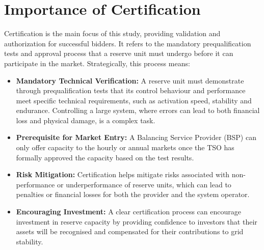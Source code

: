 \section{Importance of Certification}
Certification is the main focus of this study, providing validation and authorization for successful bidders. It refers to the mandatory prequalification tests and approval process that a reserve unit must undergo before it can participate in the market. Strategically, this process means:
\begin{itemize}
    \item \textbf{Mandatory Technical Verification:} A reserve unit must demonstrate through prequalification tests that its control behaviour and performance meet specific technical requirements, such as activation speed, stability and endurance. Controlling a large system, where errors can lead to both financial loss and physical damage, is a complex task.
    \item \textbf{Prerequisite for Market Entry:} A Balancing Service Provider (BSP) can only offer capacity to the hourly or annual markets once the TSO has formally approved the capacity based on the test results.
    \item \textbf{Risk Mitigation:} Certification helps mitigate risks associated with non-performance or underperformance of reserve units, which can lead to penalties or financial losses for both the provider and the system operator.
    \item \textbf{Encouraging Investment:} A clear certification process can encourage investment in reserve capacity by providing confidence to investors that their assets will be recognised and compensated for their contributions to grid stability.
\end{itemize}




